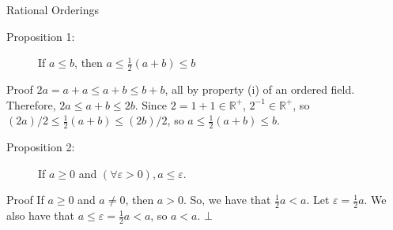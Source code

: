 \documentclass[10pt]{extarticle}
\newcommand{\R}{\mathbb{R}}
\begin{document}
  \begin{problem}{Rational Orderings}
    \begin{description}
      \item[Proposition 1:] If $a\leq b$, then $a\leq \frac{1}{2}(a+b) \leq b$
    \end{description}
    \begin{problem}{Proof}
      $2a = a+a \leq a+b \leq b+b$, all by property (i) of an ordered field.\\

      Therefore, $2a \leq a+b \leq 2b$. Since $2 = 1+1 \in \R^+$, $2^{-1}\in \R^+$, so $(2a)/2 \leq \frac{1}{2}(a+b) \leq (2b)/2$, so $a\leq \frac{1}{2}(a+b) \leq b$.
    \end{problem}
    \begin{description}
      \item[Proposition 2:] If $a\geq 0$ and $(\forall \varepsilon > 0), a\leq \varepsilon$.
    \end{description}
    \begin{problem}{Proof}
      If $a\geq 0$ and $a\neq 0$, then $a > 0$. So, we have that $\frac{1}{2}a < a$. Let $\varepsilon = \frac{1}{2}a$. We also have that $a \leq \varepsilon = \frac{1}{2}a < a$, so $a<a$. $\bot$
    \end{problem}
  \end{problem}
\end{document}
